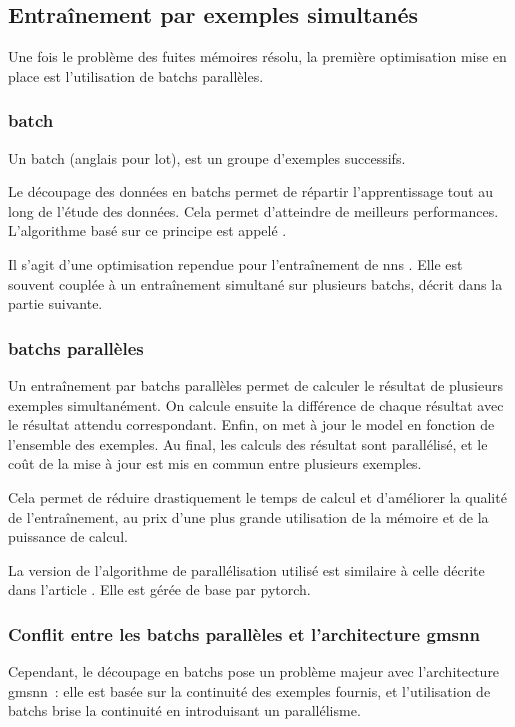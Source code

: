 \subsection{Entraînement par exemples simultanés} \label{subsec:optibatch}
Une fois le problème des fuites mémoires résolu, la première optimisation mise en place est l'utilisation de \glspl{batch} parallèles.

\subsubsection{\Gls{batch}}
Un \gls{batch} (anglais pour lot), est un groupe d'exemples successifs.

Le découpage des données en \glspl{batch} permet de répartir l'apprentissage tout au long de l'étude des données.
Cela permet d'atteindre de meilleurs performances.
L'algorithme basé sur ce principe est appelé  \autocite{batch}.

Il s'agit d'une optimisation rependue pour l'entraînement de \glspl{nn} \autocite{batch}.
Elle est souvent couplée à un entraînement simultané sur plusieurs \glspl{batch}, décrit dans la partie suivante.

\subsubsection{\Glspl{batch} parallèles}
Un entraînement par \glspl{batch} parallèles permet de calculer le résultat de plusieurs exemples simultanément.
On calcule ensuite la différence de chaque résultat avec le résultat attendu correspondant.
Enfin, on met à jour le \gls{model} en fonction de l'ensemble des exemples.
Au final, les calculs des résultat sont parallélisé, et le coût de la mise à jour est mis en commun entre plusieurs exemples.

Cela permet de réduire drastiquement le temps de calcul et d'améliorer la qualité de l'entraînement, au prix d'une plus grande utilisation de la mémoire et de la puissance de calcul.

La version de l'algorithme de parallélisation utilisé est similaire à celle décrite dans l'article \autocite{batch_parallel}. Elle est gérée de base par \gls{pytorch}.

\subsubsection{Conflit entre les \glspl{batch} parallèles et l'architecture \gls{gmsnn}}
Cependant, le découpage en \glspl{batch} pose un problème majeur avec l'architecture \gls{gmsnn}~: elle est basée sur la continuité des exemples fournis, et l'utilisation de \glspl{batch} brise la continuité en introduisant un parallélisme.

